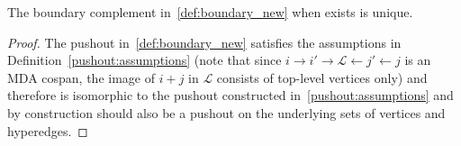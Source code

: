 \begin{proposition}
\label{prop:boundary_complement}
    The boundary complement in~\ref{def:boundary_new} when exists is unique.
\end{proposition}
\begin{proof}
        The pushout in~\ref{def:boundary_new} satisfies the assumptions in Definition~\ref{pushout:assumptions} (note that since $i \to i' \to \mathcal{L} \xleftarrow{} j' \xleftarrow{} j$ is an MDA cospan, the image of $i + j$ in $\mathcal{L}$ consists of top-level vertices only) and therefore is isomorphic to the pushout constructed in~\ref{pushout:assumptions} and by construction should also be a pushout on the underlying sets of vertices and hyperedges.

\end{proof}
